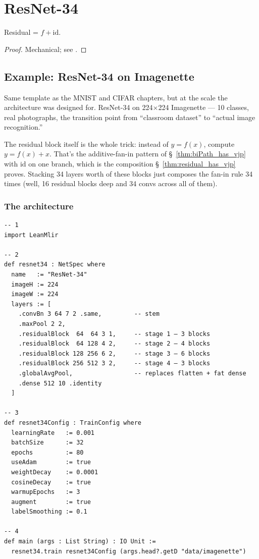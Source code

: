 \chapter{ResNet-34}
\label{chap:residual}

\begin{theorem}
  \label{thm:residual_has_vjp}
  \leanok
  Residual = \(f + \mathrm{id}\).
\end{theorem}

\begin{proof}
\leanok
Mechanical; see .
\end{proof}

\section{Example: ResNet-34 on Imagenette}
\label{sec:residual_r34_example}

Same template as the MNIST and CIFAR chapters, but at the scale the
architecture was designed for. ResNet-34 on 224$\times$224
Imagenette --- 10 classes, real photographs, the transition point
from ``classroom dataset'' to ``actual image recognition.''

The residual block itself is the whole trick: instead of $y = f(x)$,
compute $y = f(x) + x$. That's the additive-fan-in pattern of
\S~\ref{thm:biPath_has_vjp} with $\mathrm{id}$ on one branch, which
is the composition \S~\ref{thm:residual_has_vjp} proves. Stacking 34
layers worth of these blocks just composes the fan-in rule 34 times
(well, 16 residual blocks deep and 34 convs across all of them).

\subsection*{The architecture}

\begin{verbatim}
-- 1
import LeanMlir

-- 2
def resnet34 : NetSpec where
  name   := "ResNet-34"
  imageH := 224
  imageW := 224
  layers := [
    .convBn 3 64 7 2 .same,         -- stem
    .maxPool 2 2,
    .residualBlock  64  64 3 1,     -- stage 1 — 3 blocks
    .residualBlock  64 128 4 2,     -- stage 2 — 4 blocks
    .residualBlock 128 256 6 2,     -- stage 3 — 6 blocks
    .residualBlock 256 512 3 2,     -- stage 4 — 3 blocks
    .globalAvgPool,                 -- replaces flatten + fat dense
    .dense 512 10 .identity
  ]

-- 3
def resnet34Config : TrainConfig where
  learningRate   := 0.001
  batchSize      := 32
  epochs         := 80
  useAdam        := true
  weightDecay    := 0.0001
  cosineDecay    := true
  warmupEpochs   := 3
  augment        := true
  labelSmoothing := 0.1

-- 4
def main (args : List String) : IO Unit :=
  resnet34.train resnet34Config (args.head?.getD "data/imagenette")
\end{verbatim}

